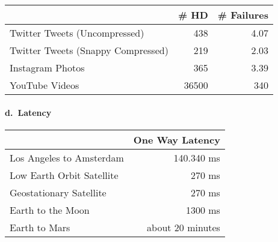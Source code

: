 \documentclass[
]{article}
\begin{document}
\begin{longtable}[]{@{}lrr@{}}
\toprule
& \# HD & \# Failures\tabularnewline
\midrule
\endhead
Twitter Tweets (Uncompressed) & 438 & 4.07\tabularnewline
Twitter Tweets (Snappy Compressed) & 219 & 2.03\tabularnewline
Instagram Photos & 365 & 3.39\tabularnewline
YouTube Videos & 36500 & 340\tabularnewline
\bottomrule
\end{longtable}

\hypertarget{d.-latency}{%
\paragraph{d.~Latency}\label{d.-latency}}

\begin{longtable}[]{@{}lr@{}}
\toprule
& One Way Latency\tabularnewline
\midrule
\endhead
Los Angeles to Amsterdam & 140.340 ms\tabularnewline
Low Earth Orbit Satellite & 270 ms\tabularnewline
Geostationary Satellite & 270 ms\tabularnewline
Earth to the Moon & 1300 ms\tabularnewline
Earth to Mars & about 20 minutes\tabularnewline
\bottomrule
\end{longtable}
\end{document}
